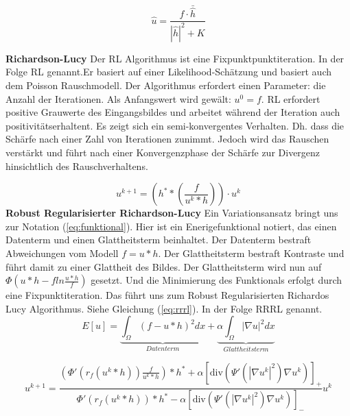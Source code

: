 \documentclass[a4paper,12pt]{article}
\begin{document}
\begin{equation} \label{eq:wiener}
\hat{u} = \frac{\hat{f}\cdot\bar{\hat{h}}} {|\hat{h}|^{2}+K}
\end{equation}

\textbf{Richardson-Lucy} \cite{richardson,lucy}
Der RL Algorithmus ist eine Fixpunktpunktiteration. In der Folge RL genannt.Er
basiert auf einer Likelihood-Schätzung und basiert auch dem Poisson
Rauschmodell.
Der Algorithmus erfordert einen Parameter: die Anzahl der Iterationen. Als Anfangswert wird
gewält: $u^0=f$. RL erfordert positive Grauwerte des Eingangsbildes und
arbeitet während der Iteration auch positivitätserhaltent. Es zeigt sich ein semi-konvergentes Verhalten. Dh. dass 
die Schärfe nach einer Zahl von Iterationen zunimmt. Jedoch wird das Rauschen
verstärkt und führt nach einer Konvergenzphase der Schärfe zur Divergenz
hinsichtlich des Rauschverhaltens.
 

\begin{equation} \label{eq:rl}
u^{k+1}= \left( h^* * \left( \frac{f}{u^{k}*h}\right) \right) \cdot{u^{k}}
\end{equation}
\textbf{Robust Regularisierter Richardson-Lucy} \cite{rrrl}
Ein Variationsansatz\cite{EFunktional_Kaveh} bringt uns zur Notation
(\ref{eq:funktional}).
Hier ist ein Enerigefunktional notiert, das einen Datenterm und einen Glattheitsterm
beinhaltet. Der Datenterm bestraft Abweichungen vom Modell $f=u*h$. Der
Glattheitsterm bestraft Kontraste und führt damit zu einer Glattheit des Bildes.
Der Glattheitsterm wird nun auf $\Phi(u*h-f ln \frac{u*h}{f})$ gesetzt. Und die
Minimierung des Funktionals erfolgt durch eine Fixpunktiteration. Das führt uns
zum Robust Regularisierten Richardos Lucy \cite{rrrl} Algorithmus. Siehe
Gleichung (\ref{eq:rrrl}). In der Folge RRRL genannt.
\begin{equation} \label{eq:funktional}
E[u] = \underset{Datenterm}{\underbrace{\int_{\Omega}(f-u*h)^2dx }} +
\underset{Glattheitsterm}{\underbrace{\alpha \int_{\Omega} |\nabla u|^2 dx }}
\end{equation}

\begin{equation} \label{eq:rrrl}
u^{k+1} = \frac{(\Phi' (r_f(u^k *h))\frac{f}{u^k*h})*h^*+\alpha
[\mathrm{div}(\Psi'(|\nabla u^k|^2) \nabla u^k )]_+}{\Phi'
(r_f(u^k*h))*h^*-\alpha[\mathrm{div}(\Psi'(|\nabla u^k |^2)\nabla u^k)]_-}u^k
\end{equation}

 
\end{document}
